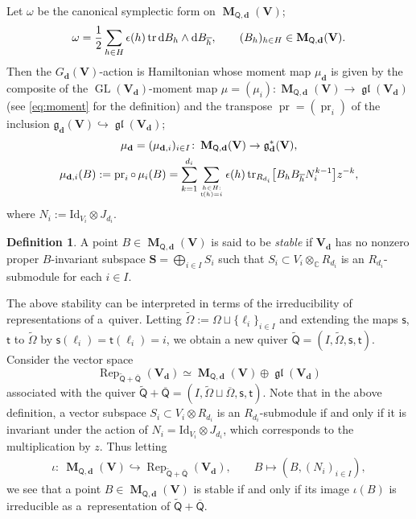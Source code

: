 \documentclass[11pt]{article}
\numberwithin{equation}{section}
\theoremstyle{definition}
\newtheorem{Definition}[Theorem]{Definition}
\newcommand{\C}{\mathbb{C}} %
\newcommand{\GL}{\operatorname{GL}} %
\newcommand{\gl}{\operatorname{\mathfrak{gl}}}
\newcommand{\g}{\mathfrak{g}} %
\newcommand{\tr}{\operatorname{tr}}
\newcommand{\unit}{\mathrm{Id}}
\newcommand{\prj}{\operatorname{pr}}
\newcommand{\Rep}{\operatorname{Rep}}
\newcommand{\bM}{\operatorname{\mathbf{M}}}
\newcommand{\bV}{\mathbf{V}}
\newcommand{\bS}{\mathbf{S}}
\newcommand{\ov}{\overline}
\newcommand{\ved}{\mathbf{d}}
\newcommand{\sumfrac}[2]{\genfrac{}{}{0pt}{2}{#1}{#2}}
\newcommand{\vin}{\mathsf{t}} %
\newcommand{\vout}{\mathsf{s}} %
\newcommand{\QQ}{\mathsf{Q}} %
\newcommand{\rd}{\mathop{\mathrm{d}\!}\mathstrut}
\begin{document}
Let $\omega$ be the canonical symplectic form on $\bM_{\QQ,\ved}(\bV)$;
\[
\omega = \frac12 \sum_{h \in H} \epsilon(h) \tr \rd B_h \wedge \rd B_{\ov{h}},
\qquad (B_h)_{h \in H} \in \bM_{\QQ,\ved}(\bV).
\]
Then the $G_\ved(\bV)$-action is Hamiltonian
whose moment map $\mu_\ved$ is given by the composite of
the $\GL(\bV_\ved)$-moment map
$\mu =(\mu_i) \colon \bM_{\QQ,\ved}(\bV) \to \gl(\bV_\ved)$
(see \eqref{eq:moment} for the def\/inition)
and the transpose
$\prj=(\prj_i)$ of the inclusion
$\g_\ved(\bV) \hookrightarrow \gl(\bV_\ved)$;
\begin{gather*}
\mu_\ved  =(\mu_{\ved,i})_{i \in I}
\colon \bM_{\QQ,\ved}(\bV) \to \g_\ved^*(\bV), \\
\mu_{\ved,i}(B)  := \prj_i \circ\, \mu_i (B)
= \sum_{k=1}^{d_i} \sum_{\sumfrac{h \in H:}{\vin(h)=i}}
\epsilon(h) \tr_{R_{d_i}}
\bigl[ B_h B_{\ov{h}} N_i^{k-1} \bigr]  z^{-k},
\end{gather*}
where $N_i := \unit_{V_i} \otimes J_{d_i}$.

\begin{Definition}\label{dfn:conf-stable}
A point $B \in \bM_{\QQ,\ved}(\bV)$
is said to be {\em stable} if
$\bV_\ved$ has no nonzero proper $B$-invariant subspace
$\bS=\bigoplus_{i \in I} S_i$ such that
$S_i \subset V_i \otimes_\C R_{d_i}$
is an $R_{d_i}$-submodule for each $i \in I$.
\end{Definition}

The above stability can be interpreted in terms of
the irreducibility of representations of a~quiver.
Letting $\widetilde{\Omega} := \Omega \sqcup \{ \ell_i \}_{i \in I}$
and extending the maps $\vout$, $\vin$ to $\widetilde{\Omega}$
by $\vout(\ell_i)=\vin(\ell_i)=i$,
we obtain a new quiver
$\widetilde{\QQ}=(I,\widetilde{\Omega},\vout,\vin)$.
Consider the vector space
\[
\Rep_{\widetilde{\QQ}+\ov{\QQ}}(\bV_\ved)
\simeq \bM_{\QQ,\ved}(\bV) \oplus \gl(\bV_\ved)
\]
associated with the quiver
$\widetilde{\QQ}+\ov{\QQ}=(I,\widetilde{\Omega}\sqcup \ov{\Omega},\vout,\vin)$.
Note that in the above def\/inition,
a vector subspace $S_i \subset V_i \otimes R_{d_i}$
is an $R_{d_i}$-submodule
if and only if it is invariant under the action of
$N_i=\unit_{V_i} \otimes J_{d_i}$,
which corresponds to the multiplication by $z$.
Thus letting
\begin{gather}\label{eq:embed}
\iota \colon \ \bM_{\QQ,\ved}(\bV) \hookrightarrow
\Rep_{\widetilde{\QQ}+\ov{\QQ}}(\bV_\ved), \qquad
B \mapsto (B, (N_i)_{i \in I}),
\end{gather}
we see that a point $B \in \bM_{\QQ,\ved}(\bV)$ is
stable if and only if its image $\iota(B)$
is irreducible as a~representation of $\widetilde{\QQ}+\ov{\QQ}$.
\end{document}
